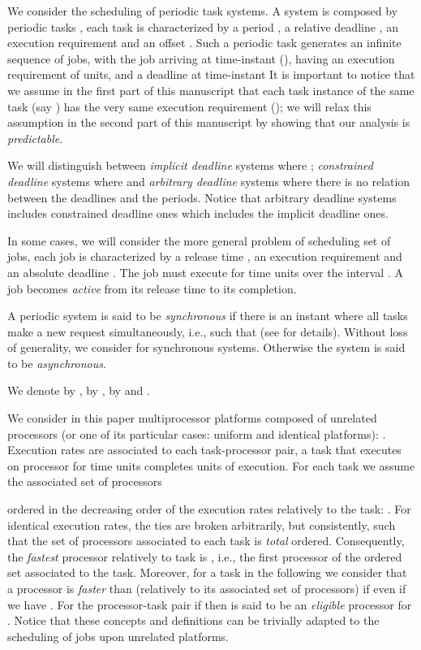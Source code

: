 \documentclass[a4paper,11pt]{article}
\begin{document}
We consider the scheduling of periodic task systems. A
system  is composed by  periodic tasks , each task is characterized by a
period , a relative deadline , an execution requirement 
 and an offset . Such a periodic task generates an
infinite sequence of jobs, with the  job
arriving at time-instant  (), having an execution requirement of  units,
and a deadline at time-instant  It is important to notice that we assume in the
first part of this manuscript that each task instance of
the same task (say ) has the very same execution
requirement (); we will relax this assumption in
the second part of this manuscript by showing that our
analysis is \emph{predictable}.

We will distinguish between {\it implicit deadline} systems where
; {\it constrained deadline} systems where  and {\it arbitrary deadline} systems where there
is no relation between the deadlines and the periods.
Notice that arbitrary deadline systems includes
constrained deadline ones which includes the implicit deadline ones.

In some cases, we will consider the more general problem of
scheduling set of jobs, each job  is characterized
by a release time , an execution requirement  and an absolute
 deadline . The job  must execute for  time units over
the interval . A job becomes {\em active} from its release
time to its completion.

A periodic system is said to be {\it synchronous} if there is an instant where
all tasks make a new request simultaneously, i.e.,  such that  (see
\cite{goossens5} for details). Without loss of generality, we consider
 for synchronous systems. Otherwise
the system is said to be {\it asynchronous}.

We denote by ,
by , by  and .

We consider in this paper multiprocessor platforms 
composed of  unrelated processors (or one of its
particular cases: uniform and identical platforms):
. Execution rates  are
associated to each task-processor pair, a task  that
executes on processor  for  time units completes
 units of execution. For each task
 we assume the associated set of processors

ordered in the decreasing order of the execution rates
relatively to the task: . For identical execution
rates, the ties are broken arbitrarily, but consistently,
such that the set of processors associated to each task is
\emph{total} ordered. Consequently, the \emph{fastest} processor
relatively to task  is , i.e., the
first processor of the ordered set associated to the task.
Moreover, for a task  in the following we consider
that a processor  is {\em faster} than  (relatively to its associated set of processors) if  even if we have . For the processor-task pair  if
 then  is said to be an \emph{eligible} processor
for . Notice that these concepts and definitions
can be trivially adapted to the scheduling of jobs upon
unrelated platforms. 
\end{document}
